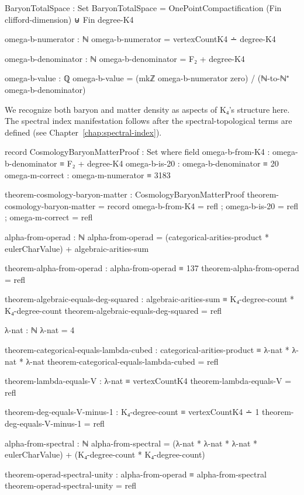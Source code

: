 \documentclass[11pt,a4paper]{book}
\begin{document}
\begin{code}
BaryonTotalSpace : Set
BaryonTotalSpace = OnePointCompactification (Fin clifford-dimension) ⊎ Fin degree-K4

omega-b-numerator : ℕ
omega-b-numerator = vertexCountK4 ∸ degree-K4

omega-b-denominator : ℕ
omega-b-denominator = F₂ + degree-K4

omega-b-value : ℚ
omega-b-value = (mkℤ omega-b-numerator zero) / (ℕ-to-ℕ⁺ omega-b-denominator)
\end{code}

We recognize both baryon and matter density as aspects of K₄'s structure here. 
The spectral index manifestation follows after the spectral-topological terms are defined
(see Chapter~\ref{chap:spectral-index}).

\begin{code}
record CosmologyBaryonMatterProof : Set where
  field
    omega-b-from-K4 : omega-b-denominator ≡ F₂ + degree-K4
    omega-b-is-20   : omega-b-denominator ≡ 20
    omega-m-correct : omega-m-numerator ≡ 3183

theorem-cosmology-baryon-matter : CosmologyBaryonMatterProof
theorem-cosmology-baryon-matter = record
  { omega-b-from-K4 = refl
  ; omega-b-is-20   = refl
  ; omega-m-correct = refl
  }
\end{code}

\begin{code}
alpha-from-operad : ℕ
alpha-from-operad = (categorical-arities-product * eulerCharValue) + algebraic-arities-sum

theorem-alpha-from-operad : alpha-from-operad ≡ 137
theorem-alpha-from-operad = refl

theorem-algebraic-equals-deg-squared : algebraic-arities-sum ≡ K₄-degree-count * K₄-degree-count
theorem-algebraic-equals-deg-squared = refl

λ-nat : ℕ
λ-nat = 4

theorem-categorical-equals-lambda-cubed : categorical-arities-product ≡ λ-nat * λ-nat * λ-nat
theorem-categorical-equals-lambda-cubed = refl

theorem-lambda-equals-V : λ-nat ≡ vertexCountK4
theorem-lambda-equals-V = refl

theorem-deg-equals-V-minus-1 : K₄-degree-count ≡ vertexCountK4 ∸ 1
theorem-deg-equals-V-minus-1 = refl

alpha-from-spectral : ℕ
alpha-from-spectral = (λ-nat * λ-nat * λ-nat * eulerCharValue) + (K₄-degree-count * K₄-degree-count)

theorem-operad-spectral-unity : alpha-from-operad ≡ alpha-from-spectral
theorem-operad-spectral-unity = refl
\end{code}
\end{document}
